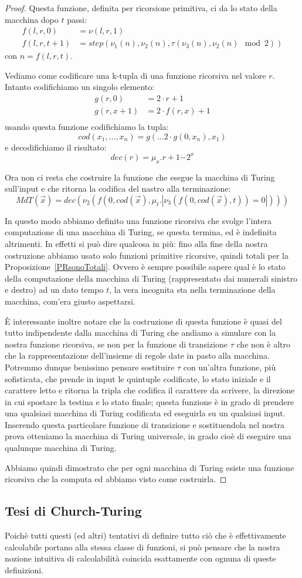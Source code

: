 \begin{proof}
Questa funzione, definita per ricorsione primitiva, ci da lo stato
della macchina dopo $t$ passi:
\begin{align*}
f(l,r,0) &= \nu(l,r,1)\\
f(l,r,t+1) &= step(\nu_1(n), \nu_2(n), \tau(\nu_3(n), \nu_2(n) \mod 2) )
\end{align*}
con $n = f(l,r,t)$.

Vediamo come codificare una k-tupla di una funzione ricorsiva nel valore $r$.
Intanto codifichiamo un singolo elemento:
\begin{align*}
g(r,0) &= 2\cdot r + 1\\ 
g(r,x+1) &= 2\cdot f(r, x) + 1\\
\end{align*}
usando questa funzione codifichiamo la tupla:
$$cod(x_1, \dots, x_n) = g(\dots 2\cdot g(0, x_n), x_1)$$
e decodifichiamo il risultato:
$$dec(r) = \mu_x.r+1\dot{-}2^x$$

Ora non ci resta che costruire la funzione che esegue la macchina di
Turing sull'input e che ritorna la codifica del nastro alla
terminazione: $$MdT(\vec{x}) = dec(\nu_2(f(0,cod(\vec{x}),\mu_t .
|\nu_3(f(0,cod(\vec{x}),t)) = 0|)))$$

In questo modo abbiamo definito una funzione ricorsiva che svolge
l'intera computazione di una macchina di Turing, se questa termina, ed
è indefinita altrimenti. In effetti si può dire qualcosa in più: fino
alla fine della nostra costruzione abbiamo usato solo funzioni
primitive ricorsive, quindi totali per la
Proposizione~\ref{PRsonoTotali}. Ovvero è sempre possibile sapere qual
è lo stato della computazione della macchina di Turing (rappresentato
dai numerali sinistro e destro) ad un dato tempo $t$, la vera
incognita sta nella terminazione della macchina, com'era giusto
aspettarsi.

È interessante inoltre notare che la costruzione di questa funzione è
quasi del tutto indipendente dalla macchina di Turing che andiamo a
simulare con la nostra funzione ricorsiva, se non per la funzione di
transizione $\tau$ che non è altro che la rappresentazione
dell'insieme di regole date in pasto alla macchina. Potremmo dunque
benissimo pensare sostituire $\tau$ con un'altra funzione, più
sofisticata, che prende in input le quintuple codificate, lo stato
iniziale e il carattere letto e ritorna la tripla che codifica il
carattere da scrivere, la direzione in cui spostare la testina e lo
stato finale; questa funzione è in grado di prendere una qualsiasi
macchina di Turing codificata ed eseguirla su un qualsiasi
input. Inserendo questa particolare funzione di transizione e
sostituendola nel nostra prova otteniamo la macchina di Turing
universale, in grado cioè di eseguire una qualunque macchina di
Turing.

Abbiamo quindi dimostrato che per ogni macchina di Turing esiste una
funzione ricorsiva che la computa ed abbiamo visto come costruirla.
\end{proof}

\subsection{Tesi di Church-Turing}
Poichè tutti questi (ed altri) tentativi di definire tutto ciò che è
effettivamente calcolabile portano alla stessa classe di funzioni, si
può pensare che la nostra nozione intuitiva di calcolabilità coincida
esattamente con ognuna di queste definizioni.
